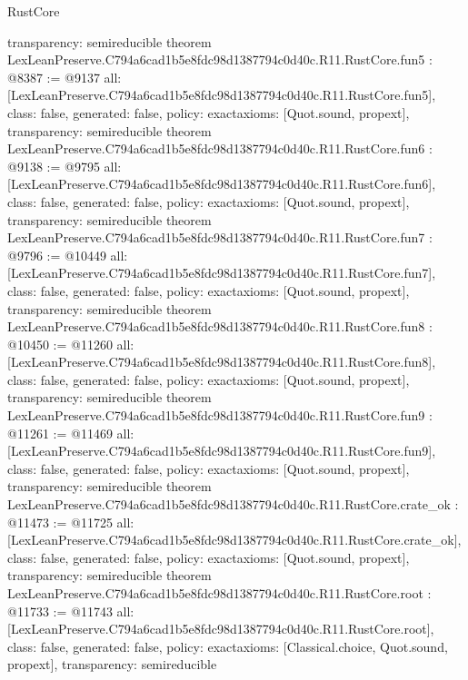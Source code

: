 \begin{lexlean}{RustCore}
\begin{coremodule}
{  transparency: semireducible
}
theorem LexLeanPreserve.C794a6cad1b5e8fdc98d1387794c0d40c.R11.RustCore.fun5 : @8387 := @9137 {
  all: [LexLeanPreserve.C794a6cad1b5e8fdc98d1387794c0d40c.R11.RustCore.fun5],
  class: false,
  generated: false,
  policy: exact{axioms: [Quot.sound, propext]},
  transparency: semireducible
}
theorem LexLeanPreserve.C794a6cad1b5e8fdc98d1387794c0d40c.R11.RustCore.fun6 : @9138 := @9795 {
  all: [LexLeanPreserve.C794a6cad1b5e8fdc98d1387794c0d40c.R11.RustCore.fun6],
  class: false,
  generated: false,
  policy: exact{axioms: [Quot.sound, propext]},
  transparency: semireducible
}
theorem LexLeanPreserve.C794a6cad1b5e8fdc98d1387794c0d40c.R11.RustCore.fun7 : @9796 := @10449 {
  all: [LexLeanPreserve.C794a6cad1b5e8fdc98d1387794c0d40c.R11.RustCore.fun7],
  class: false,
  generated: false,
  policy: exact{axioms: [Quot.sound, propext]},
  transparency: semireducible
}
theorem LexLeanPreserve.C794a6cad1b5e8fdc98d1387794c0d40c.R11.RustCore.fun8 : @10450 := @11260 {
  all: [LexLeanPreserve.C794a6cad1b5e8fdc98d1387794c0d40c.R11.RustCore.fun8],
  class: false,
  generated: false,
  policy: exact{axioms: [Quot.sound, propext]},
  transparency: semireducible
}
theorem LexLeanPreserve.C794a6cad1b5e8fdc98d1387794c0d40c.R11.RustCore.fun9 : @11261 := @11469 {
  all: [LexLeanPreserve.C794a6cad1b5e8fdc98d1387794c0d40c.R11.RustCore.fun9],
  class: false,
  generated: false,
  policy: exact{axioms: [Quot.sound, propext]},
  transparency: semireducible
}
theorem LexLeanPreserve.C794a6cad1b5e8fdc98d1387794c0d40c.R11.RustCore.crate_ok : @11473 := @11725 {
  all: [LexLeanPreserve.C794a6cad1b5e8fdc98d1387794c0d40c.R11.RustCore.crate_ok],
  class: false,
  generated: false,
  policy: exact{axioms: [Quot.sound, propext]},
  transparency: semireducible
}
theorem LexLeanPreserve.C794a6cad1b5e8fdc98d1387794c0d40c.R11.RustCore.root : @11733 := @11743 {
  all: [LexLeanPreserve.C794a6cad1b5e8fdc98d1387794c0d40c.R11.RustCore.root],
  class: false,
  generated: false,
  policy: exact{axioms: [Classical.choice, Quot.sound, propext]},
  transparency: semireducible
}


\end{coremodule}
\end{lexlean}
